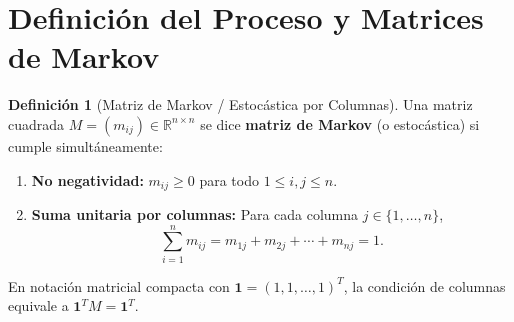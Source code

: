 \documentclass[11pt,a4paper]{article}
\theoremstyle{definition}
\newtheorem{definicion}{Definición}
\begin{document}

\section{Definición del Proceso y Matrices de Markov}

\begin{definicion}[Matriz de Markov / Estocástica por Columnas]
    Una matriz cuadrada $M = (m_{ij}) \in \mathbb{R}^{n \times n}$ se dice \textbf{matriz de Markov} (o estocástica) si cumple simultáneamente:
    \begin{enumerate}
        \item \textbf{No negatividad:} $m_{ij} \ge 0$ para todo $1 \le i, j \le n$.
        \item \textbf{Suma unitaria por columnas:} Para cada columna $j \in \{1, \dots, n\}$,
            \[
                \sum_{i=1}^n m_{ij} = m_{1j} + m_{2j} + \cdots + m_{nj} = 1.
            \]
    \end{enumerate}
    En notación matricial compacta con $\mathbf{1} = {(1, 1, \ldots, 1)}^{T}$, la condición de columnas equivale a $\mathbf{1}^T M = \mathbf{1}^T$.
\end{definicion}
\end{document}

